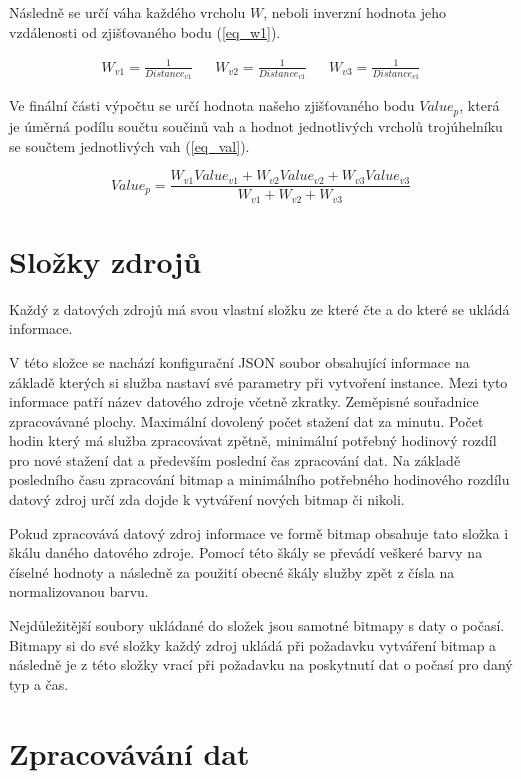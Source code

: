 \documentclass[czech,bachelor,dept460,male,csharp,cpdeclaration]{diploma}
\begin{document}
	Následně se určí váha každého vrcholu $W$, neboli inverzní hodnota jeho vzdálenosti od zjišťovaného bodu (\ref{eq_w1}).
	
	\begin{align}\label{eq_w1}
		W_{v1} =\frac{1}{Distance_{v1}} &&
		W_{v2} =\frac{1}{Distance_{v1}} &&
		W_{v3} =\frac{1}{Distance_{v1}} 
	\end{align}
	
	Ve finální části výpočtu se určí hodnota našeho zjišťovaného bodu $Value_p$, která je úměrná podílu součtu součinů vah a hodnot jednotlivých vrcholů trojúhelníku se součtem jednotlivých vah (\ref{eq_val}).
	
	\begin{equation}\label{eq_val}
		Value_p = \frac{W_{v1}Value_{v1} + W_{v2}Value_{v2} + W_{v3}Value_{v3}}{W_{v1} + W_{v2} + W_{v3}}
	\end{equation}

	\section{Složky zdrojů}
	
	Každý z datových zdrojů má svou vlastní složku ze které čte a do které se ukládá informace.
	
	V této složce se nachází konfigurační JSON soubor obsahující informace na základě kterých si služba nastaví své parametry při vytvoření instance. Mezi tyto informace patří název datového zdroje včetně zkratky. Zeměpisné souřadnice zpracovávané plochy. Maximální dovolený počet stažení dat za minutu. Počet hodin který má služba zpracovávat zpětně, minimální potřebný hodinový rozdíl pro nové stažení dat a především poslední čas zpracování dat. Na základě posledního času zpracování bitmap a minimálního potřebného hodinového rozdílu datový zdroj určí zda dojde k vytváření nových bitmap či nikoli.
	
	Pokud zpracovává datový zdroj informace ve formě bitmap obsahuje tato složka i škálu daného datového zdroje. Pomocí této škály se převádí veškeré barvy na číselné hodnoty a následně za použití obecné škály služby zpět z čísla na normalizovanou barvu.
	
	Nejdůležitější soubory ukládané do složek jsou samotné bitmapy s daty o počasí. Bitmapy si do své složky každý zdroj ukládá při požadavku vytváření bitmap a následně je z této složky vrací při požadavku na poskytnutí dat o počasí pro daný typ a čas.
	
	\section{Zpracovávání dat}
	
\end{document}

